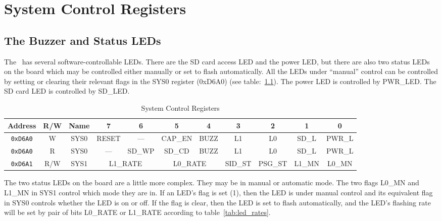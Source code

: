 \chapter{System Control Registers}
\label{sec:sysctrl}

\section*{The Buzzer and Status LEDs}

The \jr\ has several software-controllable LEDs. There are the SD card access LED and the power LED, but there are also two status LEDs on the board which may be controlled either manually or set to flash automatically. All the LEDs under ``manual'' control can be controlled by setting or clearing their relevant flags in the SYS0 register (0xD6A0) (see table:~\ref{tab:sys_ctrl_reg}). The power LED is controlled by PWR\_LED. The SD card LED is controlled by SD\_LED.

\begin{table}[ht]
    \begin{center}
        \begin{tabular}{|c|c|c|c|c|c|c|c|c|c|c|} \hline
            Address & R/W & Name & 7 & 6 & 5 & 4 & 3 & 2 & 1 & 0 \\\hline\hline

            \verb+0xD6A0+ & W & SYS0 & RESET & --- & CAP\_EN & BUZZ & L1 & L0 & SD\_L & PWR\_L \\ \hline
            \verb+0xD6A0+ & R & SYS0 & --- & SD\_WP & SD\_CD & BUZZ & L1 & L0 & SD\_L & PWR\_L \\ \hline
            \verb+0xD6A1+ & R/W & SYS1 & \multicolumn{2}{|c|}{L1\_RATE}
                                       & \multicolumn{2}{|c|}{L0\_RATE}
                                       & SID\_ST
                                       & PSG\_ST
                                       & L1\_MN & L0\_MN \\ \hline
        \end{tabular}
    \end{center}
    \caption{System Control Registers}
    \label{tab:sys_ctrl_reg}
\end{table}

The two status LEDs on the board are a little more complex. They may be in manual or automatic mode. The two flags L0\_MN and L1\_MN in SYS1 control which mode they are in. If an LED's flag is set (1), then the LED is under manual control and its equivalent flag in SYS0 controls whether the LED is on or off. If the flag is clear, then the LED is set to flash automatically, and the LED's flashing rate will be set by pair of bits L0\_RATE or L1\_RATE according to table~\ref{tab:led_rates}.

